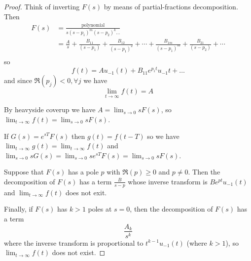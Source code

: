 \documentclass[12pt]{article}
\begin{document}
\begin{proof}
Think of inverting $F(s)$ by means of partial-fractions decomposition. Then
\begin{align*}
F(s) &= \frac{\text{polynomial}}{s{(s-p_1)}^m{(s-p_2)}^k\dots}\\
&= \frac{A}{s} + \frac{B_{11}}{(s-p_1)} + \frac{B_{12}}{{(s-p_1)}^2} + \cdots + \frac{B_{1m}}{{(s-p_1)}^m} + \frac{B_{21}}{(s-p_2)} + \cdots\\
\end{align*}
so \[ f(t) = Au_{-1}(t) + B_{11}e^{p_1 t} u_{-1}t + \dots \] and since $\Re(p_j) < 0, \forall j$ we have \[ \lim_{t\to\infty} f(t) = A \]

By heavyside coverup we have $A = \lim_{s\to 0} sF(s)$, so $\lim_{t\to\infty} f(t) = \lim_{s\to 0} sF(s)$.

If $G(s) = e^{sT}F(s)$ then $g(t) = f(t-T)$ so we have $\lim_{t\to\infty} g(t) = \lim_{t\to\infty} f(t)$ and $\lim_{s\to 0} sG(s) = \lim_{s\to 0} se^{sT} F(s) = \lim_{s\to 0} sF(s)$.

Suppose that $F(s)$ has a pole $p$ with $\Re(p) \geq 0$ and $p \neq 0$. Then the decomposition of $F(s)$ has a term $\frac{B}{s-p}$ whose inverse transform is $Be^{pt} u_{-1}(t)$ and $\lim_{t\to\infty} f(t)$ does not exit.

Finally, if $F(s)$ has $k > 1$ poles at $s = 0$, then the decomposition of $F(s)$ has a term \[ \frac{A_k}{s^k} \] where the inverse transform is proportional to $t^{k-1} u_{-1}(t)$ (where $k > 1$), so $\lim_{t\to\infty} f(t)$ does not exist.
\end{proof}
\end{document}
